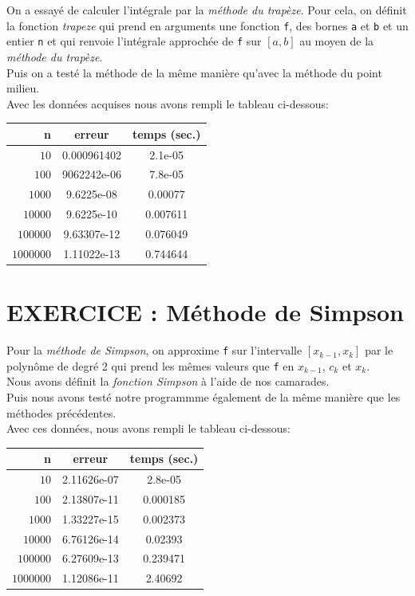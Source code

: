 \documentclass{article}
\begin{document}
	On a essayé de calculer l'intégrale par la \textit{méthode du trapèze}. Pour cela, on définit la fonction \textit{trapeze} qui prend en arguments une fonction \texttt{f}, des bornes \texttt{a} et \texttt{b} et un entier \texttt{n} et qui renvoie l'intégrale approchée de \texttt{f} sur $[a,b]$ au moyen de la \textit{méthode du trapèze}.\\

	Puis on a testé la méthode de la même manière qu'avec la méthode du point milieu. \\ 

Avec les données acquises nous avons rempli le tableau ci-dessous:
\\

\begin{center}
\begin{tabular}{r | c | c}
{n} & erreur & temps (sec.)\\
\hline
$10$ & {0.000961402} & {2.1e-05}\\
$100$ & {9062242e-06} & {7.8e-05}\\
$1000$ & {9.6225e-08} & {0.00077}\\
$10000$ & {9.6225e-10} & {0.007611}\\
$100000$ & {9.63307e-12} & {0.076049}\\
$1000000$ & {1.11022e-13} & {0.744644}
\end{tabular}
\end{center}

\section{EXERCICE : Méthode de Simpson}

Pour la \textit{méthode de Simpson}, on approxime \texttt{f} sur l'intervalle $[x_{k-1}, x_k]$ par le polynôme de degré 2 qui prend les mêmes valeurs que \texttt{f} en $x_{k-1}$, $c_k$ et $x_k$.\\
Nous avons définit la \textit{fonction Simpson} à l'aide de nos camarades.\\ 

	Puis nous avons testé notre programmme également de la même manière que les méthodes précédentes.\\ 
	Avec ces données, nous avons rempli le tableau ci-dessous: \\

\begin{center}
\begin{tabular}{r | c | c}
{n} & erreur & temps (sec.)\\
\hline
$10$ & {2.11626e-07} & {2.8e-05}\\
$100$ & {2.13807e-11 } & {0.000185}\\
$1000$ & {1.33227e-15} & {0.002373}\\
$10000$ & {6.76126e-14} & {0.02393}\\
$100000$ & {6.27609e-13} & {0.239471}\\
$1000000$ & {1.12086e-11} & {2.40692}
\end{tabular}
\end{center}
\end{document}
